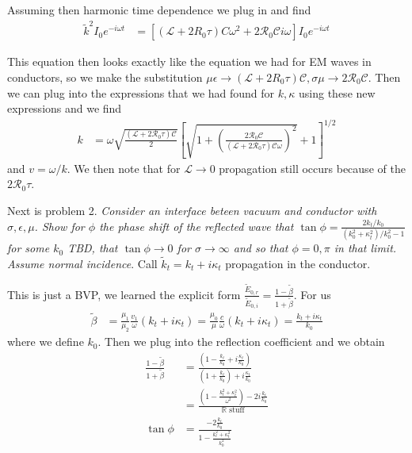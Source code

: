 \documentclass[10pt]{report}
\begin{document}
Assuming then harmonic time dependence we plug in and find
\begin{align}
    \tilde{k}^2 I_0e^{-i\omega t} &= \left[ \left( \mathcal{L} + 2R_0\tau \right)C\omega^2 + 2\mathcal{R_0C}i\omega \right]I_0e^{-i\omega t}
\end{align}

This equation then looks exactly like the equation we had for EM waves in conductors, so we make the substitution $\mu \epsilon \to \left( \mathcal{L} + 2R_0\tau \right)\mathcal{C}, \sigma \mu \to 2\mathcal{R}_0\mathcal{C}$. Then we can plug into the expressions that we had found for $k,\kappa$ using these new expressions and we find
\begin{align}
    k &= \omega \sqrt{\frac{(\mathcal{L} + 2\mathcal{R}_0 \tau)\mathcal{C}}{2}}\left[ \sqrt{1 + \left( \frac{2\mathcal{R}_0\mathcal{C}}{(\mathcal{L} + 2\mathcal{R}_0 \tau)\mathcal{C}\omega} \right)^2} + 1 \right]^{1/2}
\end{align}
and $v = \omega/k$. We then note that for $\mathcal{L} \to 0$ propagation still occurs because of the $2\mathcal{R}_0\tau$.

Next is problem 2. \emph{Consider an interface beteen vacuum and conductor with $\sigma, \epsilon, \mu$. Show for $\phi$ the phase shift of the reflected wave that $\tan \phi = \frac{2k_t/k_0}{(k_0^2 + \kappa_t^2)/k_0^2 - 1}$ for some $k_0$ TBD, that $\tan \phi \to 0$ for $\sigma \to \infty$ and so that $\phi = 0,\pi$ in that limit. Assume normal incidence}. Call $\tilde{k}_t = k_t + i\kappa_t$ propagation in the conductor.

This is just a BVP, we learned the explicit form $\frac{\tilde{E}_{0,r}}{\tilde{E}_{0,i}} = \frac{1 - \tilde{\beta}}{1 + \tilde{\beta}}$. For us
\begin{align}
    \tilde{\beta} &= \frac{\mu_1}{\mu_2}\frac{v_1}{\omega}(k_t + i\kappa_t) = \frac{\mu_0}{\mu}\frac{c}{\omega}(k_t + i\kappa_t) = \frac{k_t + i\kappa_t}{k_0}
\end{align}
where we define $k_0$. Then we plug into the reflection coefficient and we obtain
\begin{align}
    \frac{1 - \tilde{\beta}}{1 + \tilde{\beta}} &= \frac{\left( 1 - \frac{k_t}{k_0} + i\frac{\kappa_t}{k_0} \right)}{\left( 1 + \frac{k_t}{k_0} \right) + i\frac{\kappa_t}{k_0}}\\
    &= \frac{\left( 1 - \frac{k_t^2 + \kappa_t^2}{\omega^2} \right) - 2i\frac{k_t}{k_0}}{\mathbb{R}\text{ stuff}}\\
    \tan \phi &= \frac{-2\frac{k_t}{k_0}}{1 - \frac{k_t^2 + \kappa_t^2}{k_0^2}}
\end{align}
\end{document}
